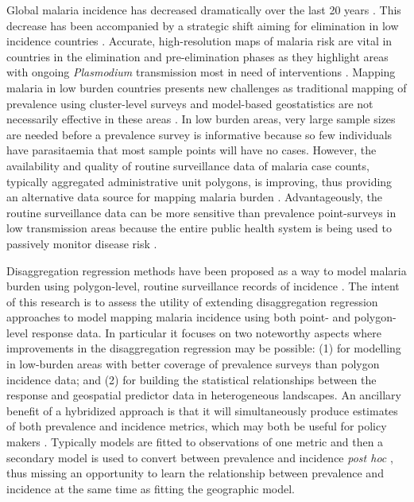 \documentclass{statsoc}
\begin{document}
Global malaria incidence has decreased dramatically over the last 20 years \citep{bhatt2015effect, weiss2019mapping, battle2019mapping}.
This decrease has been accompanied by a strategic shift aiming for elimination in low incidence countries \citep{world2016world, newby2016path}.
Accurate, high-resolution maps of malaria risk are vital in countries in the elimination and pre-elimination phases as they highlight areas with ongoing \emph{Plasmodium} transmission most in need of interventions \citep{sturrock2016mapping, cohen2017mapping}.
Mapping malaria in low burden countries presents new challenges as traditional mapping of prevalence \citep{gething2011new, bhatt2017improved, gething2012long, bhatt2015effect} using cluster-level surveys and model-based geostatistics are not necessarily effective in these areas \citep{sturrock2016mapping, sturrock2014fine}.
In low burden areas, very large sample sizes are needed before a prevalence survey is informative because so few individuals have parasitaemia that most sample points will have no cases.
However, the availability and quality of routine surveillance data of malaria case counts, typically aggregated administrative unit polygons, is improving, thus providing an alternative data source for mapping malaria burden \citep{sturrock2016mapping, ohrt2015information, cibulskis2011worldwide}.
Advantageously, the routine surveillance data can be more sensitive than prevalence point-surveys in low transmission areas because the entire public health system is being used to passively monitor disease risk \citep{cibulskis2011worldwide}.

Disaggregation regression methods have been proposed as a way to model malaria burden using polygon-level, routine surveillance records of incidence \citep{sturrock2014fine, wilson2017pointless, law2018variational, taylor2017continuous, li2012log}.
The intent of this research is to assess the utility of extending disaggregation regression approaches to model mapping malaria incidence using both point- and polygon-level response data. 
In particular it focuses on two noteworthy aspects where improvements in  the disaggregation regression may be possible:
(1) for modelling in low-burden areas with better coverage of prevalence surveys than polygon incidence data; and
(2) for building the statistical relationships between the response and geospatial predictor data in heterogeneous landscapes. An ancillary benefit of a hybridized approach is that it will simultaneously produce estimates of both prevalence and incidence metrics, which may both be useful for policy makers \citep{cohen2017mapping}.
Typically models are fitted to observations of one metric and then a secondary model is used to convert between prevalence and incidence \emph{post hoc} \citep{battle2019mapping, bhatt2015effect}, thus missing an opportunity to learn the relationship between prevalence and incidence at the same time as fitting the geographic model. 
\end{document}
